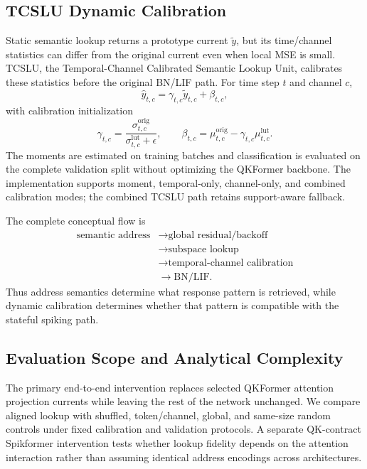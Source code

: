 \subsection{TCSLU Dynamic Calibration}
\label{sec:tcslu}

Static semantic lookup returns a prototype current $\tilde y$, but its
time/channel statistics can differ from the original current even when local
MSE is small. TCSLU, the Temporal-Channel Calibrated Semantic Lookup Unit,
calibrates these statistics before the original BN/LIF path. For time step $t$
and channel $c$,
\begin{equation}
  \hat y_{t,c}
  =\gamma_{t,c}\tilde y_{t,c}+\beta_{t,c},
  \label{eq:tcslu}
\end{equation}
with calibration initialization
\begin{equation}
  \gamma_{t,c}=
  \frac{\sigma^{\mathrm{orig}}_{t,c}}
       {\sigma^{\mathrm{lut}}_{t,c}+\epsilon},
  \qquad
  \beta_{t,c}=
  \mu^{\mathrm{orig}}_{t,c}
  -\gamma_{t,c}\mu^{\mathrm{lut}}_{t,c}.
\end{equation}
The moments are estimated on training batches and classification is evaluated
on the complete validation split without optimizing the QKFormer backbone.
The implementation supports moment, temporal-only, channel-only, and combined
calibration modes; the combined TCSLU path retains support-aware fallback.

The complete conceptual flow is
\begin{equation}
\begin{aligned}
\text{semantic address}
&\rightarrow \text{global residual/backoff}\\
&\rightarrow \text{subspace lookup}\\
&\rightarrow \text{temporal-channel calibration}\\
&\rightarrow \text{BN/LIF}.
\end{aligned}
\end{equation}
Thus address semantics determine what response pattern is retrieved, while
dynamic calibration determines whether that pattern is compatible with the
stateful spiking path.

\subsection{Evaluation Scope and Analytical Complexity}
\label{sec:method_scope}

The primary end-to-end intervention replaces selected QKFormer attention
projection currents while leaving the rest of the network unchanged. We compare
aligned lookup with shuffled, token/channel, global, and same-size random
controls under fixed calibration and validation protocols. A separate
QK-contract Spikformer intervention tests whether lookup fidelity depends on
the attention interaction rather than assuming identical address encodings
across architectures.

